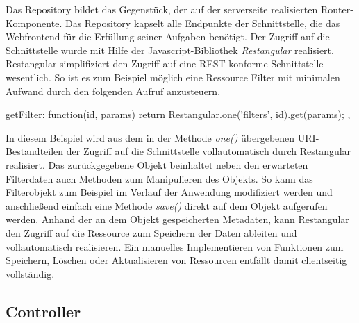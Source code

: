 Das Repository bildet das Gegenstück, der auf der serverseite realisierten Router-Komponente. Das Repository kapselt alle Endpunkte der Schnittstelle, die das Webfrontend für die Erfüllung seiner Aufgaben benötigt. Der Zugriff auf die Schnittstelle wurde mit Hilfe der Javascript-Bibliothek \emph{Restangular} realisiert. Restangular simplifiziert den Zugriff auf eine REST-konforme Schnittstelle wesentlich. So ist es zum Beispiel möglich eine Ressource Filter mit minimalen Aufwand durch den folgenden Aufruf anzusteuern.
\begin{JsCode}[numbers=none]
     getFilter: function(id, params) {
                    return Restangular.one('filters', id).get(params);
                },
\end{JsCode}
In diesem Beispiel wird aus dem in der Methode \emph{one()} übergebenen URI-Bestandteilen der Zugriff auf die Schnittstelle vollautomatisch durch Restangular realisiert. Das zurückgegebene Objekt beinhaltet neben den erwarteten Filterdaten auch Methoden zum Manipulieren des Objekts. So kann das Filterobjekt zum Beispiel im Verlauf der Anwendung modifiziert werden und anschließend einfach eine Methode \emph{save()} direkt auf dem Objekt aufgerufen werden. Anhand der an dem Objekt gespeicherten Metadaten, kann Restangular den Zugriff auf die Ressource zum Speichern der Daten ableiten und vollautomatisch realisieren. Ein manuelles Implementieren von Funktionen zum Speichern, Löschen oder Aktualisieren von Ressourcen entfällt damit clientseitig vollständig. 

\subsection{Controller}

